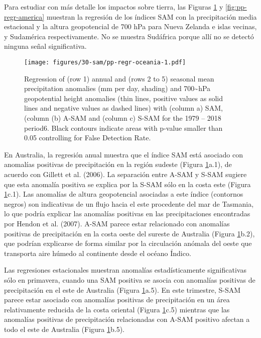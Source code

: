 \documentclass[12pt,oneside]{reedthesis}
\begin{document}
Para estudiar con más detalle los impactos sobre tierra, las Figuras \ref{fig:pp-regr-oceania} y \ref{fig:pp-regr-america} muestran la regresión de los índices SAM con la precipitación media estacional y la altura geopotencial de 700 hPa para Nueva Zelanda e islas vecinas, y Sudamérica respectivamente.
No se muestra Sudáfrica porque allí no se detectó ninguna señal significativa.
\begin{figure}
\centering
\texttt{[image: figures/30-sam/pp-regr-oceania-1.pdf]}
\caption{\label{fig:pp-regr-oceania}Regression of (row 1) annual and (rows 2 to 5) seasonal mean precipitation anomalies (mm per day, shading) and 700\textasciitilde hPa geopotential height anomalies (thin lines, positive values as solid lines and negative values as dashed lines) with (column a) SAM, (column (b) A-SAM and (column c) S-SAM for the 1979 -- 2018 period6. Black contours indicate areas with p-value smaller than 0.05 controlling for False Detection Rate.}
\end{figure}
En Australia, la regresión anual muestra que el índice SAM está asociado con anomalías positivas de precipitación en la región sudeste (Figura \ref{fig:pp-regr-oceania}a.1), de acuerdo con Gillett et al. (2006).
La separación entre A\nobreakdash-SAM y S\nobreakdash-SAM sugiere que esta anomalía positiva se explica por la S\nobreakdash-SAM sólo en la costa este (Figura \ref{fig:pp-regr-oceania}c.1).
Las anomalías de altura geopotencial asociadas a este índice (contornos negros) son indicativas de un flujo hacia el este procedente del mar de Tasmania, lo que podría explicar las anomalías positivas en las precipitaciones encontradas por Hendon et al. (2007).
A\nobreakdash-SAM parece estar relacionado con anomalías positivas de precipitación en la costa oeste del sureste de Australia (Figura \ref{fig:pp-regr-oceania}b.2), que podrían explicarse de forma similar por la circulación anómala del oeste que transporta aire húmedo al continente desde el océano Índico.

Las regresiones estacionales muestran anomalías estadísticamente significativas sólo en primavera, cuando una SAM positiva se asocia con anomalías positivas de precipitación en el este de Australia (Figura \ref{fig:pp-regr-oceania}a.5).
En este trimestre, S\nobreakdash-SAM parece estar asociado con anomalías positivas de precipitación en un área relativamente reducida de la costa oriental (Figura \ref{fig:pp-regr-oceania}c.5) mientras que las anomalías positivas de precipitación relacionadas con A\nobreakdash-SAM positivo afectan a todo el este de Australia (Figura \ref{fig:pp-regr-oceania}b.5).
\end{document}
